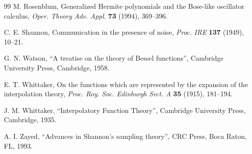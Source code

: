 \documentclass[11pt]{amsart}
\theoremstyle{plain}
\begin{document}
\begin{thebibliography}{99}
 M. Rosenblum,
{Generalized Hermite polynomials and the Bose-like oscillator calculus,}
\textit{Oper. Theory Adv. Appl.}
\textbf{73} (1994), 369--396.

 C. E. Shannon,
{Communication in the presence of noise,}
\textit{Proc. IRE}
\textbf{137} (1949), 10--21.

 G. N. Watson, 
{``A treatise on the theory of Bessel functions'',}
Cambridge University Press, Cambridge, 1958.

 E. T. Whittaker, 
{On the functions which are represented by the expansion of the interpolation theory,}
\textit{Proc. Roy. Soc. Edinburgh Sect. A}
\textbf{35} (1915), 181--194.

 J. M. Whittaker, 
{``Interpolatory Function Theory'',} 
Cambridge University Press, Cambridge, 1935.

 A. I. Zayed,
{``Advances in Shannon's sampling theory'',} CRC Press, Boca Raton, FL, 1993.

\end{thebibliography}

\end{document}
